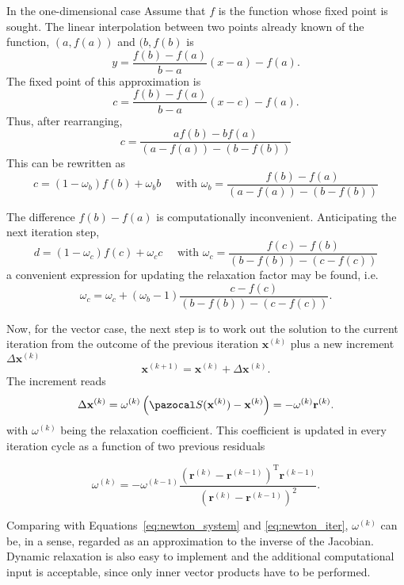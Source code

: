 In the one-dimensional case
Assume that \(f\) is the function whose fixed point is sought.
The linear interpolation between two points already known of the function, \((a, f(a))\) and \((b, f(b)\) is
\begin{equation}
  y = \frac{f(b)-f(a)}{b-a}(x-a) - f(a).
\end{equation}
The fixed point of this approximation is
\begin{equation}
  c = \frac{f(b)-f(a)}{b-a}(x-c) - f(a).
\end{equation}
Thus, after rearranging,
\begin{equation}
c=\frac{a f(b)- b f(a)}{\left(a-f(a)\right)-\left(b-f(b)\right)}
\end{equation}
This can be rewritten as
\begin{equation}
c=\left(1-\omega_{b}\right) f(b)+\omega_{b} b \quad \text { with } \omega_{b}=\frac{f(b)-f(a)}{\left(a-f(a)\right)-\left(b-f(b)\right)}
\end{equation}

The difference \(f(b)-f(a)\) is computationally inconvenient.
Anticipating the next iteration step,
\begin{equation}
d=\left(1-\omega_{c}\right) f(c)+\omega_{c} c \quad \text { with } \omega_{c}=\frac{f(c)-f(b)}{\left(b-f(b)\right)-\left(c-f(c)\right)}
\end{equation}
a convenient expression for updating the relaxation factor may be found, i.e.
\begin{equation}
\omega_{c}=\omega_{c}+\left(\omega_{b}-1\right) \frac{c-f(c)}{\left(b-f(b)\right)-\left(c-f(c)\right)}.
\end{equation}

Now, for the vector case, the next step is to work out the solution to the current iteration from the outcome of the previous iteration $\mathbf{x}^{(k)}$ plus a new increment $\Delta \mathbf{x}^{(k)}$
\begin{equation}
\mathbf{x}^{(k+1)}=\mathbf{x}^{(k)}+\Delta \mathbf{x}^{(k)}.
\end{equation}
The increment reads
\begin{equation}
\Delta \mathbf{x}^{(k)}=\omega^{(k)}\left(\pazocal S(\mathbf{x}^{(k)})-\mathbf{x}^{(k)}\right)=-\omega^{(k)} \mathbf r^{(k)}.
\end{equation}
with $\omega^{(k)}$ being the relaxation coefficient.
This coefficient is updated in every iteration cycle as a function of two previous residuals
\begin{highlight}
  \begin{equation}
    \omega^{(k)}=-\omega^{(k-1)} \frac{\left(\mathbf{r}^{(k)}-\mathbf{r}^{(k-1)}\right)^{\mathrm{T}} \mathbf{r}^{(k-1)}}{\left(\mathbf{r}^{(k)}-\mathbf{r}^{(k-1)}\right)^{2}}.
  \end{equation}
\end{highlight}
Comparing with Equations~\eqref{eq:newton_system} and \eqref{eq:newton_iter}, \(\omega^{(k)}\) can be, in a sense, regarded as an approximation to the inverse of the Jacobian.
Dynamic relaxation is also easy to implement and the additional computational input is acceptable, since only inner vector products have to be performed.


